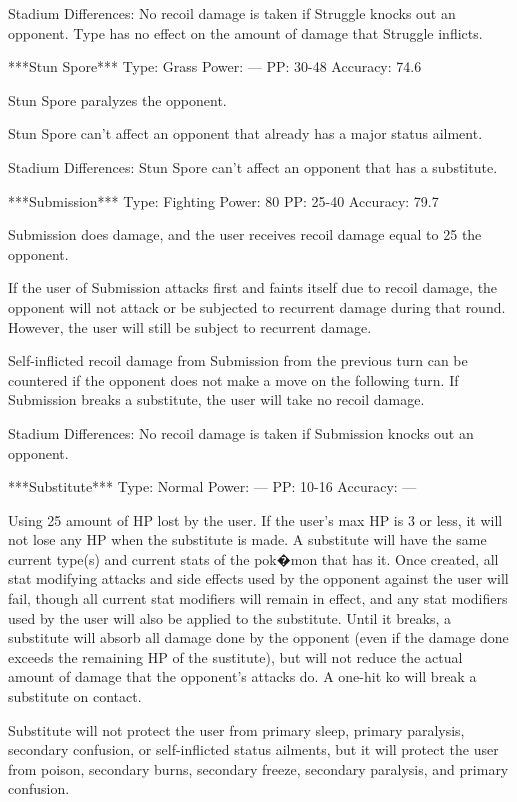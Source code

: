 \documentclass[reprint, aps, prl, paper=A4]{revtex4-1}
\begin{document}
Stadium Differences:
No recoil damage is taken if Struggle knocks out an opponent. Type has no effect on the amount
of damage that Struggle inflicts.


***Stun Spore***
Type: Grass
Power: ---
PP: 30-48
Accuracy: 74.6%

Stun Spore paralyzes the opponent.

Stun Spore can't affect an opponent that already has a major status ailment.

Stadium Differences:
Stun Spore can't affect an opponent that has a substitute.


***Submission***
Type: Fighting
Power: 80
PP: 25-40
Accuracy: 79.7%

Submission does damage, and the user receives recoil damage equal to 25%
the opponent.

If the user of Submission attacks first and faints itself due to recoil damage, the opponent
will not attack or be subjected to recurrent damage during that round. However, the user will
still be subject to recurrent damage.

Self-inflicted recoil damage from Submission from the previous turn can be countered if the
opponent does not make a move on the following turn. If Submission breaks a substitute, the
user will take no recoil damage.

Stadium Differences:
No recoil damage is taken if Submission knocks out an opponent.


***Substitute***
Type: Normal
Power: ---
PP: 10-16
Accuracy: ---

Using 25%
amount of HP lost by the user. If the user's max HP is 3 or less, it will not lose any HP when
the substitute is made. A substitute will have the same current type(s) and current stats of
the pok�mon that has it. Once created, all stat modifying attacks and side effects used by the
opponent against the user will fail, though all current stat modifiers will remain in effect,
and any stat modifiers used by the user will also be applied to the substitute. Until it
breaks, a substitute will absorb all damage done by the opponent (even if the damage done
exceeds the remaining HP of the sustitute), but will not reduce the actual amount of damage
that the opponent's attacks do. A one-hit ko will break a substitute on contact.

Substitute will not protect the user from primary sleep, primary paralysis, secondary
confusion, or self-inflicted status ailments, but it will protect the user from poison,
secondary burns, secondary freeze, secondary paralysis, and primary confusion.
\end{document}
